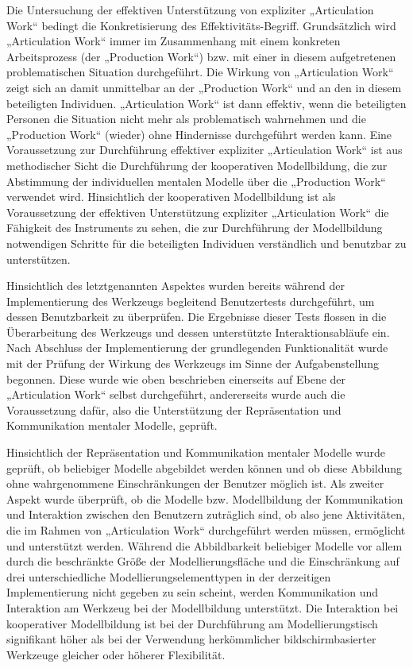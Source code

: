 Die Untersuchung der effektiven Unterstützung von expliziter „Articulation Work“ bedingt die Konkretisierung des Effektivitäts-Begriff. Grundsätzlich wird „Articulation Work“ immer im Zusammenhang mit einem konkreten Arbeitsprozess (der „Production Work“) bzw. mit einer in diesem aufgetretenen problematischen Situation durchgeführt. Die Wirkung von „Articulation Work“ zeigt sich an damit unmittelbar an der „Production Work“ und an den in diesem beteiligten Individuen. „Articulation Work“ ist dann effektiv, wenn die beteiligten Personen die Situation nicht mehr als problematisch wahrnehmen und die „Production Work“ (wieder) ohne Hindernisse durchgeführt werden kann. Eine Voraussetzung zur Durchführung effektiver expliziter „Articulation Work“ ist aus methodischer Sicht die Durchführung der kooperativen Modellbildung, die zur Abstimmung der individuellen mentalen Modelle über die „Production Work“ verwendet wird. Hinsichtlich der kooperativen Modellbildung ist als Voraussetzung der effektiven Unterstützung expliziter „Articulation Work“ die Fähigkeit des Instruments zu sehen, die zur Durchführung der Modellbildung notwendigen Schritte für die beteiligten Individuen verständlich und benutzbar zu unterstützen.

Hinsichtlich des letztgenannten Aspektes wurden bereits während der Implementierung des Werkzeugs begleitend Benutzertests durchgeführt, um dessen Benutzbarkeit zu überprüfen. Die Ergebnisse dieser Tests flossen in die Überarbeitung des Werkzeugs und dessen unterstützte Interaktionsabläufe ein. Nach Abschluss der Implementierung der grundlegenden Funktionalität wurde mit der Prüfung der Wirkung des Werkzeugs im Sinne der Aufgabenstellung begonnen. Diese wurde wie oben beschrieben einerseits auf Ebene der „Articulation Work“ selbst durchgeführt, andererseits wurde auch die Voraussetzung dafür, also die Unterstützung der Repräsentation und Kommunikation mentaler Modelle, geprüft.

Hinsichtlich der Repräsentation und Kommunikation mentaler Modelle wurde geprüft, ob beliebiger Modelle abgebildet werden können und ob diese Abbildung ohne wahrgenommene Einschränkungen der Benutzer möglich ist. Als zweiter Aspekt wurde überprüft, ob die Modelle bzw. Modellbildung der Kommunikation und Interaktion zwischen den Benutzern zuträglich sind, ob also jene Aktivitäten, die im Rahmen von „Articulation Work“ durchgeführt werden müssen, ermöglicht und unterstützt werden. Während die Abbildbarkeit beliebiger Modelle vor allem durch die beschränkte Größe der Modellierungsfläche und die Einschränkung auf drei unterschiedliche Modellierungselementtypen in der derzeitigen Implementierung nicht gegeben zu sein scheint, werden Kommunikation und Interaktion am Werkzeug bei der Modellbildung unterstützt. Die Interaktion bei kooperativer Modellbildung ist bei der Durchführung am Modellierungstisch signifikant höher als bei der Verwendung herkömmlicher bildschirmbasierter Werkzeuge gleicher oder höherer Flexibilität.

